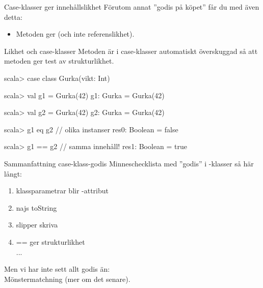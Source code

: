 

\begin{Slide}{Case-klasser ger innehållslikhet}
Förutom annat ''godis på köpet'' får du med  även detta:
\begin{itemize}
\item Metoden \code{==} ger  (och inte referenslikhet).
\end{itemize}
\end{Slide}



\begin{Slide}{Likhet och case-klasser}
Metoden  är i case-klasser automatiskt överskuggad så att metoden \code{==} ger test av strukturlikhet.
\begin{REPL}
scala> case class Gurka(vikt: Int)

scala> val g1 = Gurka(42)
g1: Gurka = Gurka(42)

scala> val g2 = Gurka(42)
g2: Gurka = Gurka(42)

scala> g1 eq g2          // olika instanser
res0: Boolean = false

scala> g1 == g2          // samma innehåll!
res1: Boolean = true
\end{REPL}
\end{Slide}



\begin{Slide}{Sammanfattning case-klass-godis}
Minneschecklista med ''godis'' i -klasser så här långt:
\begin{enumerate}
\item klassparametrar blir -attribut
\item najs toString
\item slipper skriva 
\item == ger strukturlikhet
\pause~\\...
\end{enumerate}

\vspace{1em}Men vi har inte sett allt godis än: \\Mönstermatchning (mer om det senare).
\end{Slide}
